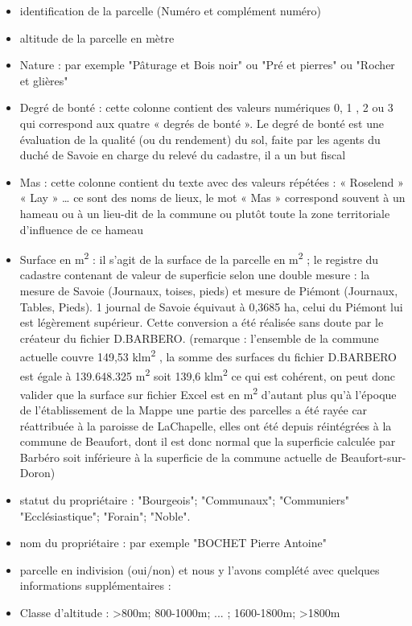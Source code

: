 \documentclass[12pt,a4paper]{report}
\begin{document}
\begin{itemize}
	\item identification de la parcelle (Numéro et complément numéro)
	\item altitude de la parcelle en mètre
	\item Nature : par exemple "Pâturage et Bois noir" ou "Pré et pierres" ou "Rocher et glières"
	\item Degré de bonté : cette colonne contient des valeurs numériques 0, 1 , 2 ou 3 qui correspond aux quatre « degrés de bonté ». Le degré de bonté est une évaluation de la qualité (ou du rendement) du sol, faite par les agents du duché de Savoie en charge du relevé du cadastre, il a un but fiscal
	\item Mas : cette colonne contient du texte avec des valeurs répétées : « Roselend » « Lay » … ce sont des noms de lieux, le mot « Mas » correspond souvent à un hameau ou à un lieu-dit de la commune ou plutôt toute la zone territoriale d’influence de ce hameau
	\item Surface en m\textsuperscript{2} : il s’agit de la surface de la parcelle en m\textsuperscript{2} ; le registre du cadastre contenant de valeur de superficie selon une double mesure : la mesure de Savoie (Journaux, toises, pieds) et mesure de Piémont (Journaux, Tables, Pieds). 1 journal de Savoie équivaut à 0,3685 ha, celui du Piémont lui est légèrement supérieur. Cette conversion a été réalisée sans doute par le créateur du fichier D.BARBERO. (remarque : l’ensemble de la commune actuelle couvre 149,53 klm\textsuperscript{2} , la somme des surfaces du fichier D.BARBERO est égale à 139.648.325 m\textsuperscript{2} soit 139,6 klm\textsuperscript{2} ce qui est cohérent, on peut donc valider que la surface sur fichier Excel est en m\textsuperscript{2} d'autant plus qu'à l'époque de l'établissement de la Mappe une partie des parcelles a été rayée car réattribuée à la paroisse de LaChapelle, elles ont été depuis réintégrées à la commune de Beaufort, dont il est donc normal que la superficie calculée par Barbéro soit inférieure à la superficie de la commune actuelle de Beaufort-sur-Doron) 
	\item statut du propriétaire : "Bourgeois"; "Communaux"; "Communiers" "Ecclésiastique"; "Forain"; "Noble".
	\item nom du propriétaire : par exemple "BOCHET Pierre Antoine"
	\item parcelle en indivision (oui/non)
et nous y l'avons complété avec quelques informations supplémentaires :
	\item Classe d'altitude : >800m; 800-1000m; ... ; 1600-1800m; >1800m

\end{itemize}
\end{document}
